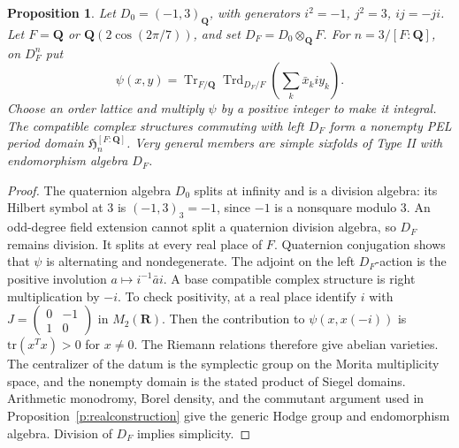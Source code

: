 \documentclass[11pt,reqno]{article}
\theoremstyle{emphasizedplain}
\theoremstyle{emphasizeddefinition}
\theoremstyle{emphasizeddefinition}
\newtheorem{preproposition}[prelemma]{Proposition}
\DeclareMathOperator{\Tr}{Tr}
\DeclareMathOperator{\Trd}{Trd}
\newcommand{\Q}{\mathbf Q}
\newcommand{\R}{\mathbf R}
\begin{document}
\begin{preproposition}\label{p:quaternionconstruction}
Let $D_0=(-1,3)_\Q$, with generators $i^2=-1$, $j^2=3$, $ij=-ji$.
Let $F=\Q$ or $\Q(2\cos(2\pi/7))$, and set $D_F=D_0\otimes_\Q F$.
For $n=3/[F:\Q]$, on $D_F^n$ put
\[
 \psi(x,y)=\Tr_{F/\Q}\Trd_{D_F/F}\left(\sum_k\bar x_k i y_k\right).
\]
Choose an order lattice and multiply $\psi$ by a positive integer to make
it integral. The compatible complex structures commuting with left $D_F$
form a nonempty PEL period domain $\mathfrak H_n^{[F:\Q]}$. Very general
members are simple sixfolds of Type II with endomorphism algebra $D_F$.
\end{preproposition}
\begin{proof}
The quaternion algebra $D_0$ splits at infinity and is a division algebra:
its Hilbert symbol at $3$ is $(-1,3)_3=-1$, since $-1$ is a nonsquare modulo
$3$. An odd-degree field extension cannot split a quaternion division
algebra, so $D_F$ remains division. It splits at every real place of $F$.
Quaternion conjugation shows that $\psi$ is alternating and nondegenerate.
The adjoint on the left $D_F$-action is the positive involution
$a\mapsto i^{-1}\bar a i$. A base compatible complex structure is right
multiplication by $-i$. To check positivity, at a real place identify
$i$ with $J=\left(\begin{smallmatrix}0&-1\\1&0\end{smallmatrix}\right)$
in $M_2(\R)$. Then the contribution to $\psi(x,x(-i))$ is
$\mathrm{tr}(x^T x)>0$ for $x\ne0$.
The Riemann relations therefore give abelian varieties. The centralizer of
the datum is the symplectic group on the Morita multiplicity space, and the
nonempty domain is the stated product of Siegel domains.
Arithmetic monodromy, Borel density, and the commutant argument used in
Proposition~\ref{p:realconstruction} give the generic Hodge group and
endomorphism algebra. Division of $D_F$ implies simplicity.
\end{proof}
\end{document}
